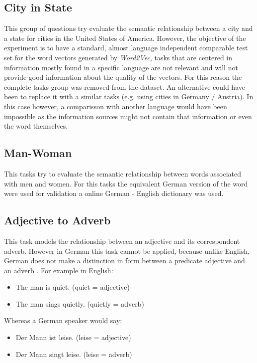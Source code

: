 \subsection{City in State}
\label{sec:sub_sec_city_in_state}
This group of questions try evaluate the semantic relationship between a city
and a state for cities in the United States of America.  However, the
objective of the experiment is to have a standard,  almost
language independent comparable test set for the word vectors generated by \textit{Word2Vec}, tasks that
are centered in information mostly found in a specific language are not relevant and
will not provide good information about the quality of the vectors. For this
reason the complete tasks group was removed from the dataset. An alternative could have been to replace it with a similar
tasks (e.g. using cities in Germany / Austria). In this case however,  a
comparisson with another language would have been impossible as the
information sources might not contain that information or even the word
themselves.

\subsection{Man-Woman}
\label{sec:sub_sec_man_woman}
This tasks try to evaluate the semantic relationship between words associated
with men and women. For this tasks the equivalent German version of the word
were used for validation a  online German - English dictionary was used.

\subsection{Adjective to Adverb}
\label{sec:sub_sec_adjetive_adverb}
This task models the relationship between an adjective and its correspondent
adverb. However in German this task cannot be applied,  because unlike English,
German does not make a distinction in form between a predicate adjective and
an adverb \cite{durrell2011hammer}. For example in English:

\begin{itemize}
\item The man is quiet. (quiet = adjective)
\item The man sings quietly. (quietly = adverb)
\end{itemize}

Whereas a German speaker would say:

\begin{itemize}
\item Der Mann ist leise. (leise = adjective)
\item Der Mann singt leise. (leise = adverb)
\end{itemize}


